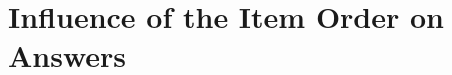 \clearpage
\section{Influence of the Item Order on Answers}\label{app:order}

\begin{table}[!htbp] 
  \caption[Influence of the item order on answers]{Influence of the item order on answers.\hfill (Back~to~Section~\ref{par:data_quality}.)}\label{tab:order} 
  \makebox[\textwidth][c]{\resizebox{.98\paperwidth}{!}{}}
\end{table}





